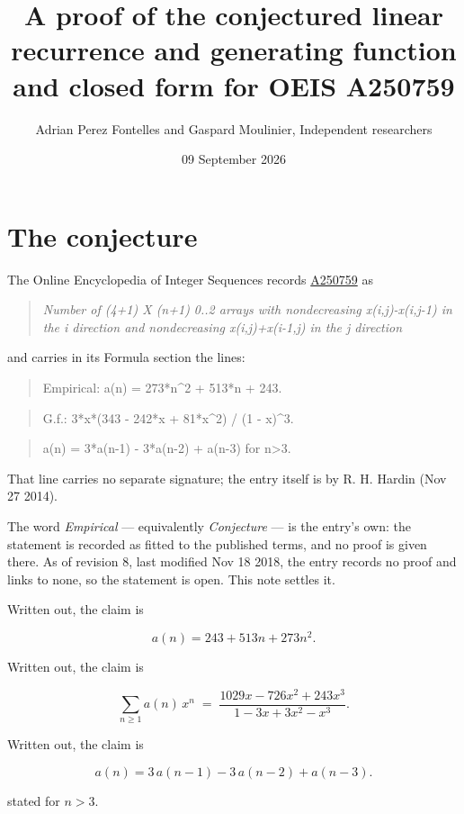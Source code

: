 \documentclass[11pt]{article}
\title{A proof of the conjectured linear recurrence and generating function and closed form for OEIS A250759}
\author{Adrian Perez Fontelles and Gaspard Moulinier, Independent researchers}
\date{09 September 2026}
\theoremstyle{definition}
\begin{document}
\maketitle
\section{The conjecture}

The Online Encyclopedia of Integer Sequences records \href{https://oeis.org/A250759}{A250759} as

\begin{quote}\itshape Number of (4+1) X (n+1) 0..2 arrays with nondecreasing x(i,j)-x(i,j-1) in the i direction and nondecreasing x(i,j)+x(i-1,j) in the j direction\end{quote}

and carries in its Formula section the lines:

\begin{quote}\ttfamily Empirical: a(n) = 273*n\textasciicircum{}2 + 513*n + 243.\end{quote}

\begin{quote}\ttfamily G.f.: 3*x*(343 - 242*x + 81*x\textasciicircum{}2) / (1 - x)\textasciicircum{}3.\end{quote}

\begin{quote}\ttfamily a(n) = 3*a(n-1) - 3*a(n-2) + a(n-3) for n>3.\end{quote}

That line carries no separate signature; the entry itself is by R. H. Hardin (Nov 27 2014).

The word {\itshape Empirical} --- equivalently {\itshape Conjecture} --- is the entry's own: the statement is recorded as fitted to the published terms, and no proof is given there. As of revision 8, last modified Nov 18 2018, the entry records no proof and links to none, so the statement is open. This note settles it.

Written out, the claim is

\[a(n) = 243 + 513n + 273n^{2}.\]

Written out, the claim is

\[\sum_{n \ge 1} a(n)\,x^n \;=\; \frac{1029x - 726x^{2} + 243x^{3}}{1 - 3x + 3x^{2} - x^{3}}.\]

Written out, the claim is

\[a(n) = 3\,a(n-1) - 3\,a(n-2) + a(n-3).\]

stated for $n > 3$.
\end{document}
